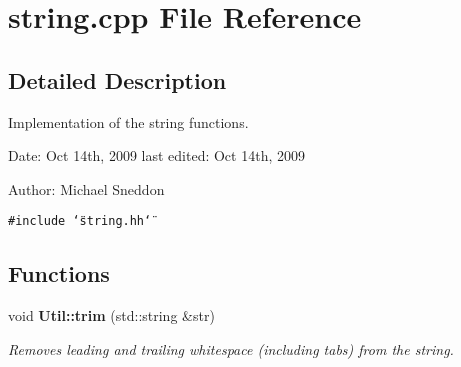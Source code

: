 \section{string.cpp File Reference}
\label{string_8cpp}


\subsection{Detailed Description}
Implementation of the string functions.

\begin{Desc}
\item[Date:]Oct 14th, 2009 last edited: Oct 14th, 2009\end{Desc}
\begin{Desc}
\item[Author:]Michael Sneddon \end{Desc}


{\tt \#include \char`\"{}string.hh\char`\"{}}\par
\subsection*{Functions}
\begin{CompactItemize}
\item 
void {\bf Util::trim} (std::string \&str)
\begin{CompactList}\small\item\em Removes leading and trailing whitespace (including tabs) from the string. \item\end{CompactList}\end{CompactItemize}

